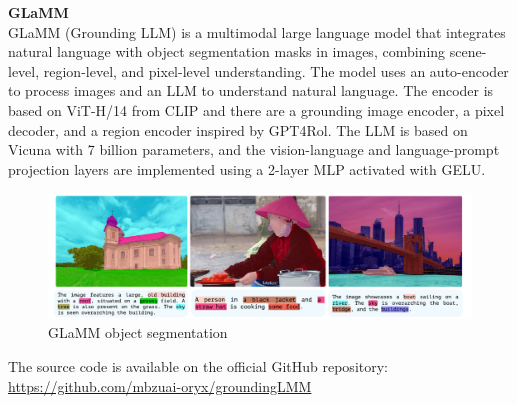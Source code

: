\textbf{GLaMM}\\
GLaMM (Grounding LLM) is a multimodal large language model that integrates natural language with object segmentation masks in images, combining scene-level, region-level, and pixel-level understanding. 
The model uses an auto-encoder to process images and an LLM to understand natural language. The encoder is based on ViT-H/14 from CLIP and there are a grounding image encoder, a pixel decoder, and a region encoder inspired by GPT4Rol. The LLM is based on Vicuna with 7 billion parameters, and the vision-language and language-prompt projection layers are implemented using a 2-layer MLP activated with GELU. \cite{rasheed2024glamm}
\begin{figure}[H]
    \centering
    \includegraphics[width=0.9\linewidth]{Figures/fig_23.png}
    \caption{GLaMM object segmentation}
    \label{fig:enter-label}
\end{figure}
The source code is available on the official GitHub repository:\\ \href{https://github.com/mbzuai-oryx/groundingLMM}{https://github.com/mbzuai-oryx/groundingLMM}\\

